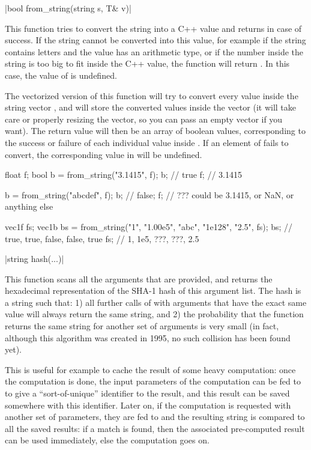 \item \vectorfunc \cppinline|bool from_string(string s, T& v)| 

This function tries to convert the string  into a C++ value  and returns \cpptrue in case of success. If the string cannot be converted into this value, for example if the string contains letters and the value has an arithmetic type, or if the number inside the string is too big to fit inside the C++ value, the function will return \cppfalse. In this case, the value of  is undefined.

The vectorized version of this function will try to convert every value inside the string vector , and will store the converted values inside the vector  (it will take care or properly resizing the vector, so you can pass an empty vector if you want). The return value will then be an array of boolean values, corresponding to the success or failure of each individual value inside . If an element of  fails to convert, the corresponding value in  will be undefined.

\begin{example}
\begin{cppcode}
float f;
bool b = from_string("3.1415", f);
b; // true
f; // 3.1415

b = from_string("abcdef", f);
b; // false;
f; // ??? could be 3.1415, or NaN, or anything else

vec1f fs;
vec1b bs = from_string({"1", "1.00e5", "abc", "1e128", "2.5"}, fs);
bs; // {true, true, false, false, true}
fs; // {1,    1e5,  ???,   ???,   2.5}
\end{cppcode}
\end{example}

\item \cppinline|string hash(...)| 

This function scans all the arguments that are provided, and returns the hexadecimal representation of the SHA-1 hash of this argument list. The hash is a string such that: 1) all further calls of  with arguments that have the exact same value will always return the same string, and 2) the probability that the function returns the same string for another set of arguments is very small (in fact, although this algorithm was created in 1995, no such collision has been found yet).

This is useful for example to cache the result of some heavy computation: once the computation is done, the input parameters of the computation can be fed to  to give a ``sort-of-unique'' identifier to the result, and this result can be saved somewhere with this identifier. Later on, if the computation is requested with another set of parameters, they are fed to  and the resulting string is compared to all the saved results: if a match is found, then the associated pre-computed result can be used immediately, else the computation goes on.

